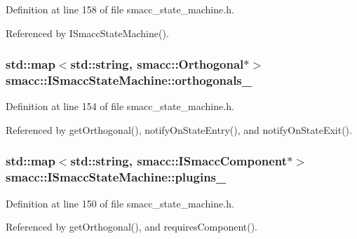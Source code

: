 Definition at line 158 of file smacc\+\_\+state\+\_\+machine.\+h.



Referenced by I\+Smacc\+State\+Machine().

\subsubsection[{\texorpdfstring{orthogonals\+\_\+}{orthogonals_}}]{\setlength{\rightskip}{0pt plus 5cm}std\+::map$<$std\+::string, {\bf smacc\+::\+Orthogonal}$\ast$$>$ smacc\+::\+I\+Smacc\+State\+Machine\+::orthogonals\+\_\+\hspace{0.3cm}{\ttfamily [private]}}\hypertarget{classsmacc_1_1ISmaccStateMachine_a919af0d70a7583a7440b02f387f7faa5}{}\label{classsmacc_1_1ISmaccStateMachine_a919af0d70a7583a7440b02f387f7faa5}


Definition at line 154 of file smacc\+\_\+state\+\_\+machine.\+h.



Referenced by get\+Orthogonal(), notify\+On\+State\+Entry(), and notify\+On\+State\+Exit().

\subsubsection[{\texorpdfstring{plugins\+\_\+}{plugins_}}]{\setlength{\rightskip}{0pt plus 5cm}std\+::map$<$std\+::string, {\bf smacc\+::\+I\+Smacc\+Component}$\ast$$>$ smacc\+::\+I\+Smacc\+State\+Machine\+::plugins\+\_\+\hspace{0.3cm}{\ttfamily [private]}}\hypertarget{classsmacc_1_1ISmaccStateMachine_aaf2f1f4dec865e5b6a92a6fb231f204f}{}\label{classsmacc_1_1ISmaccStateMachine_aaf2f1f4dec865e5b6a92a6fb231f204f}


Definition at line 150 of file smacc\+\_\+state\+\_\+machine.\+h.



Referenced by get\+Orthogonal(), and requires\+Component().

